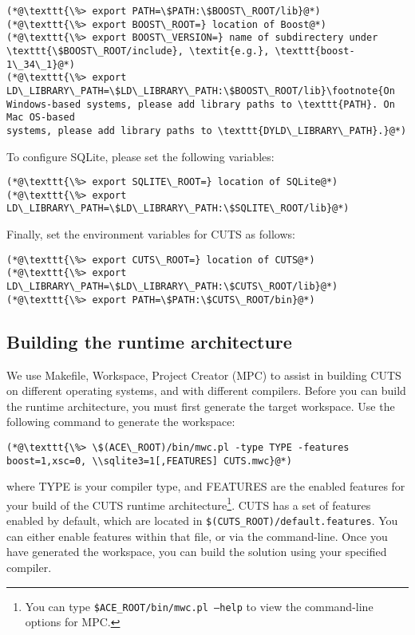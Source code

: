 \begin{lstlisting}
(*@\texttt{\%> export PATH=\$PATH:\$BOOST\_ROOT/lib}@*)
(*@\texttt{\%> export BOOST\_ROOT=} location of Boost@*)
(*@\texttt{\%> export BOOST\_VERSION=} name of subdirectery under \texttt{\$BOOST\_ROOT/include}, \textit{e.g.}, \texttt{boost-1\_34\_1}@*)
(*@\texttt{\%> export LD\_LIBRARY\_PATH=\$LD\_LIBRARY\_PATH:\$BOOST\_ROOT/lib}\footnote{On
Windows-based systems, please add library paths to \texttt{PATH}. On Mac OS-based
systems, please add library paths to \texttt{DYLD\_LIBRARY\_PATH}.}@*)
\end{lstlisting}
To configure SQLite, please set the following variables:
\begin{lstlisting}
(*@\texttt{\%> export SQLITE\_ROOT=} location of SQLite@*)
(*@\texttt{\%> export LD\_LIBRARY\_PATH=\$LD\_LIBRARY\_PATH:\$SQLITE\_ROOT/lib}@*)
\end{lstlisting}
Finally, set the environment variables for CUTS as follows:
\begin{lstlisting}
(*@\texttt{\%> export CUTS\_ROOT=} location of CUTS@*)
(*@\texttt{\%> export LD\_LIBRARY\_PATH=\$LD\_LIBRARY\_PATH:\$CUTS\_ROOT/lib}@*)
(*@\texttt{\%> export PATH=\$PATH:\$CUTS\_ROOT/bin}@*)
\end{lstlisting}

\subsection{Building the runtime architecture}

We use Makefile, Workspace, Project Creator (MPC) to assist in building CUTS
on different operating systems, and with different compilers. Before you can
build the runtime architecture, you must first generate the target workspace.
Use the following command to generate the workspace:
\begin{lstlisting}
(*@\texttt{\%> \$(ACE\_ROOT)/bin/mwc.pl -type TYPE -features boost=1,xsc=0, \\sqlite3=1[,FEATURES] CUTS.mwc}@*)
\end{lstlisting}
where TYPE is your compiler type, and FEATURES are the enabled features
for your build of the CUTS runtime architecture\footnote{You can type 
\texttt{\$ACE\_ROOT/bin/mwc.pl --help} to view the command-line options for 
MPC.}. CUTS has a set of features enabled by default, which are located 
in \texttt{\$(CUTS\_ROOT)/default.features}. You can either enable features 
within that file, or via the command-line. Once you have generated the 
workspace, you can build the solution using your specified compiler.


